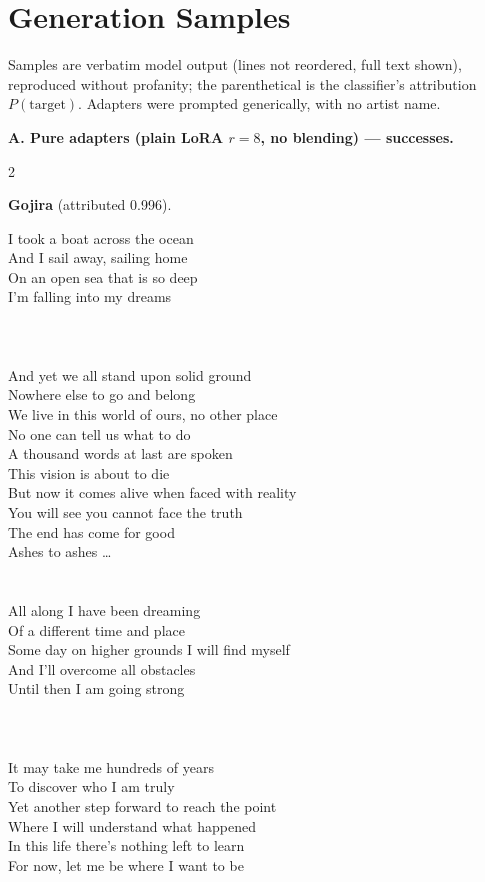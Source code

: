 \section{Generation Samples}
\label{app:samples}
\small
Samples are verbatim model output (lines not reordered, full text shown), reproduced without profanity; the parenthetical is the classifier's attribution $P(\text{target})$. Adapters were prompted generically, with no artist name.

\bigskip\bigskip
\noindent\textbf{\large A. Pure adapters (plain LoRA $r{=}8$, no blending) --- successes.}\par\medskip
\begin{multicols}{2}\raggedright
\nopagebreak\noindent\textbf{Gojira} (attributed 0.996).\par\nopagebreak\vspace{4pt}
{\footnotesize\itshape\raggedright
I took a boat across the ocean \\
And I sail away, sailing home \\
On an open sea that is so deep \\
I'm falling into my dreams \\
\mbox{} \\
\mbox{} \\
\mbox{} \\
And yet we all stand upon solid ground \\
Nowhere else to go and belong \\
We live in this world of ours, no other place \\
No one can tell us what to do \\
A thousand words at last are spoken \\
This vision is about to die \\
But now it comes alive when faced with reality \\
You will see you cannot face the truth \\
The end has come for good \\
Ashes to ashes \ldots{} \\
\mbox{} \\
\mbox{} \\
All along I have been dreaming \\
Of a different time and place \\
Some day on higher grounds I will find myself \\
And I'll overcome all obstacles \\
Until then I am going strong \\
\mbox{} \\
\mbox{} \\
\mbox{} \\
It may take me hundreds of years \\
To discover who I am truly \\
Yet another step forward to reach the point \\
Where I will understand what happened \\
In this life there's nothing left to learn \\
For now, let me be where I want to be\par}
\medskip


\end{multicols}
